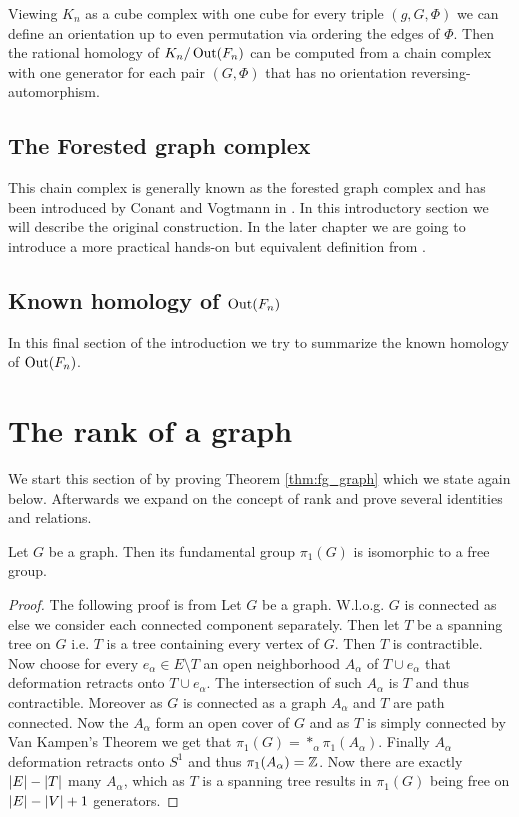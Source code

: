 Viewing $K_{n}$ as a cube complex with one cube for every triple $(g,G,\Phi)$ we can define an orientation up to even permutation
via ordering the edges of $\Phi$. Then the rational homology of $K_{n} / \operatorname{Out}(F_{n})$ can be
computed from a chain complex with one generator for each pair $(G,\Phi)$ that has no orientation
reversing-automorphism.

\subsection{The Forested graph complex}
This chain complex is generally known as the forested graph complex and has been
introduced by Conant and Vogtmann in \cite{conant03}. In this introductory section
we will describe the original construction. In the later chapter we are going to
introduce a more practical hands-on but equivalent definition from \cite{conant08}.



\subsection{Known homology of $\operatorname{Out}(F_{n})$}
In this final section of the introduction we try to summarize the known homology of $\operatorname{Out}(F_{n})$.

\newpage


\section{The rank of a graph}
We start this section of by proving Theorem \ref{thm:fg_graph} which we state again below.
Afterwards we expand on the concept of rank and prove several identities and relations.

\begin{theorem}
	Let $G$ be a graph. Then its fundamental group $\pi_{1}(G)$ is isomorphic to a free group.
\end{theorem}

\begin{proof}
	The following proof is from \cite[p. 43f]{hatcher00}
	Let $G$ be a graph. W.l.o.g. $G$ is connected as else we consider each connected component separately. 
	Then let $T$ be a spanning tree on $G$ i.e. $T$ is a tree containing every vertex of $G$.
	Then $T$ is contractible.
	Now choose for every $e_{\alpha} \in E \setminus T$ an open neighborhood $A_{\alpha}$ of $T \cup e_{\alpha}$ that deformation retracts onto $T \cup e_{\alpha}$.
	The intersection of such $A_{\alpha}$ is $T$ and thus contractible. Moreover as $G$ is connected as a graph $A_{\alpha}$ and $T$ are path connected.
	Now the $A_{\alpha}$ form an open cover of $G$ and as $T$ is simply connected by Van Kampen's Theorem we get that $\pi_{1}(G) = *_{\alpha} \pi_{1}(A_{\alpha})$.
	Finally $A_{\alpha}$ deformation retracts onto $S^{1}$ and thus $\pi_{1}(A_{\alpha}) = \mathbb{Z}$. Now there are exactly $\abs{E} - \abs{T}$ many $A_{\alpha}$,
	which as $T$ is a spanning tree results in $\pi_1(G)$ being free on $\abs{E} - \abs{V} + 1$ generators.
\end{proof}


